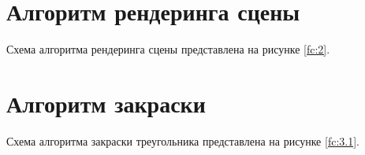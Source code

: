 \section{Алгоритм рендеринга сцены}
Схема алгоритма рендеринга сцены представлена на рисунке \ref{fc:2}.
\begin{figure}[ht!]
\end{figure}
\section{Алгоритм закраски}
Схема алгоритма закраски треугольника представлена на рисунке \ref{fc:3.1}.
\begin{figure}[ht!]
\end{figure}

